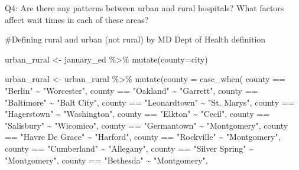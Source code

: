 \documentclass[
  letterpaper,
  DIV=11,
  numbers=noendperiod]{scrartcl}
\newenvironment{Shaded}{\begin{snugshade}}{\end{snugshade}}
\newcommand{\AttributeTok}[1]{\textcolor[rgb]{0.40,0.45,0.13}{#1}}
\newcommand{\CommentTok}[1]{\textcolor[rgb]{0.37,0.37,0.37}{#1}}
\newcommand{\FunctionTok}[1]{\textcolor[rgb]{0.28,0.35,0.67}{#1}}
\newcommand{\NormalTok}[1]{\textcolor[rgb]{0.00,0.23,0.31}{#1}}
\newcommand{\OtherTok}[1]{\textcolor[rgb]{0.00,0.23,0.31}{#1}}
\newcommand{\SpecialCharTok}[1]{\textcolor[rgb]{0.37,0.37,0.37}{#1}}
\newcommand{\StringTok}[1]{\textcolor[rgb]{0.13,0.47,0.30}{#1}}
\begin{document}
Q4: Are there any patterns between urban and rural hospitals? What
factors affect wait times in each of these areas?

\begin{Shaded}
\begin{Highlighting}[]
\CommentTok{\#Defining rural and urban (not rural) by MD Dept of Health definition}

\NormalTok{urban\_rural }\OtherTok{\textless{}{-}}\NormalTok{ january\_ed }\SpecialCharTok{\%\textgreater{}\%} 
  \FunctionTok{mutate}\NormalTok{(}\AttributeTok{county=}\NormalTok{city) }

\NormalTok{urban\_rural }\OtherTok{\textless{}{-}}\NormalTok{ urban\_rural }\SpecialCharTok{\%\textgreater{}\%}
   \FunctionTok{mutate}\NormalTok{(}\AttributeTok{county =} \FunctionTok{case\_when}\NormalTok{(}
\NormalTok{     county }\SpecialCharTok{==} \StringTok{"Berlin"} \SpecialCharTok{\textasciitilde{}} \StringTok{"Worcester"}\NormalTok{,}
\NormalTok{     county }\SpecialCharTok{==} \StringTok{"Oakland"} \SpecialCharTok{\textasciitilde{}} \StringTok{"Garrett"}\NormalTok{,}
\NormalTok{     county }\SpecialCharTok{==} \StringTok{"Baltimore"} \SpecialCharTok{\textasciitilde{}} \StringTok{"Balt City"}\NormalTok{,}
\NormalTok{     county }\SpecialCharTok{==} \StringTok{"Leonardtown"} \SpecialCharTok{\textasciitilde{}} \StringTok{"St. Marys"}\NormalTok{,}
\NormalTok{     county }\SpecialCharTok{==} \StringTok{"Hagerstown"} \SpecialCharTok{\textasciitilde{}} \StringTok{"Washington"}\NormalTok{,}
\NormalTok{     county }\SpecialCharTok{==} \StringTok{"Elkton"} \SpecialCharTok{\textasciitilde{}} \StringTok{"Cecil"}\NormalTok{,}
\NormalTok{    county }\SpecialCharTok{==} \StringTok{"Salisbury"} \SpecialCharTok{\textasciitilde{}} \StringTok{"Wicomico"}\NormalTok{,}
\NormalTok{     county }\SpecialCharTok{==} \StringTok{"Germantown"} \SpecialCharTok{\textasciitilde{}} \StringTok{"Montgomery"}\NormalTok{,}
\NormalTok{     county }\SpecialCharTok{==} \StringTok{"Havre De Grace"} \SpecialCharTok{\textasciitilde{}} \StringTok{"Harford"}\NormalTok{,}
\NormalTok{     county }\SpecialCharTok{==} \StringTok{"Rockville"} \SpecialCharTok{\textasciitilde{}} \StringTok{"Montgomery"}\NormalTok{,}
\NormalTok{     county }\SpecialCharTok{==} \StringTok{"Cumberland"} \SpecialCharTok{\textasciitilde{}} \StringTok{"Allegany"}\NormalTok{,}
\NormalTok{     county }\SpecialCharTok{==} \StringTok{"Silver Spring"} \SpecialCharTok{\textasciitilde{}} \StringTok{"Montgomery"}\NormalTok{,}
\NormalTok{     county }\SpecialCharTok{==} \StringTok{"Bethesda"} \SpecialCharTok{\textasciitilde{}} \StringTok{"Montgomery"}\NormalTok{,}

\end{Highlighting}
\end{Shaded}
\end{document}
